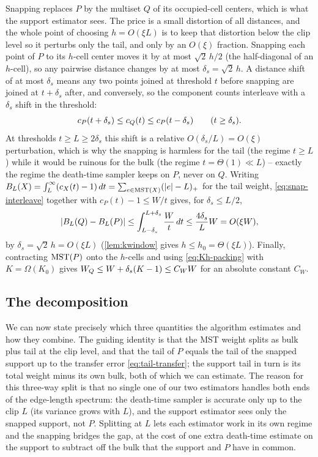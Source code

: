 Snapping replaces $P$ by the multiset $Q$ of its occupied-cell centers, which is what the support estimator
sees. The price is a small distortion of all distances, and the whole point of choosing $h=O(\xi L)$ is to
keep that distortion below the clip level so it perturbs only the tail, and only by an $O(\xi)$ fraction.
Snapping each point of $P$ to its $h$-cell center moves it by at most $\sqrt2\,h/2$ (the half-diagonal of
an $h$-cell), so any pairwise distance changes by at most $\delta_s=\sqrt2\,h$. A distance shift of at most
$\delta_s$ means any two points joined at threshold $t$ before snapping are joined at $t+\delta_s$ after,
and conversely, so the component counts interleave with a $\delta_s$ shift in the threshold:
\begin{equation}\label{eq:snap-interleave}
  c_P(t+\delta_s)\le c_Q(t)\le c_P(t-\delta_s)\qquad(t\ge\delta_s).
\end{equation}
At thresholds $t\ge L\ge 2\delta_s$ this shift is a relative $O(\delta_s/L)=O(\xi)$ perturbation, which is
why the snapping is harmless for the tail (the regime $t\ge L$) while it would be ruinous for the bulk (the
regime $t=\Theta(1)\ll L$) -- exactly the regime the death-time sampler keeps on $P$, never on $Q$.
Writing $B_L(X)=\int_L^\infty(c_X(t)-1)\,dt=\sum_{e\in\mathrm{MST}(X)}(\left|e\right|-L)_+$ for the tail weight,
\eqref{eq:snap-interleave} together with $c_P(t)-1\le W/t$ gives, for $\delta_s\le L/2$,
\begin{equation}\label{eq:tail-transfer}
  \left|B_L(Q)-B_L(P)\right|\le\int_{L-\delta_s}^{L+\delta_s}\frac Wt\,dt\le\frac{4\delta_s}{L}W=O(\xi W),
\end{equation}
by $\delta_s=\sqrt2\,h=O(\xi L)$ (\cref{lem:kwindow} gives $h\le h_0=\Theta(\xi L)$). Finally, contracting $\mathrm{MST}(P)$ onto the $h$-cells and using \eqref{eq:Kh-packing}
with $K=\Omega(K_0)$ gives $W_Q\le W+\delta_s(K-1)\le C_W W$ for an absolute constant $C_W$.

\subsection{The decomposition}\label{sec:dt-decomp}

We can now state precisely which three quantities the algorithm estimates and how they combine. The
guiding identity is that the MST weight splits as bulk plus tail at the clip level, and that the tail of
$P$ equals the tail of the snapped support up to the transfer error \eqref{eq:tail-transfer}; the support
tail in turn is its total weight minus its own bulk, both of which we can estimate. The reason for this
three-way split is that no single one of our two estimators handles both ends of the edge-length spectrum:
the death-time sampler is accurate only up to the clip $L$ (its variance grows with $L$), and the support
estimator sees only the snapped support, not $P$. Splitting at $L$ lets each estimator work in its own
regime and the snapping bridges the gap, at the cost of one extra death-time estimate on the support to
subtract off the bulk that the support and $P$ have in common.

